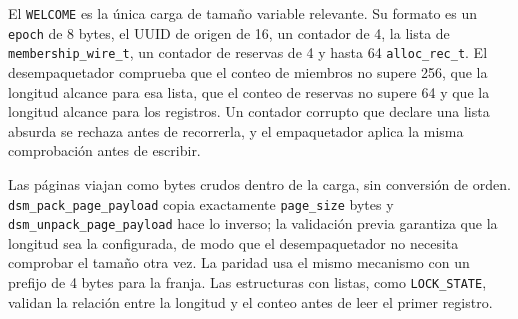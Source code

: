 El \texttt{WELCOME} es la única carga de tamaño variable relevante. Su formato es un \texttt{epoch} de 8 bytes, el UUID de origen de 16, un contador de 4, la lista de \texttt{membership\_wire\_t}, un contador de reservas de 4 y hasta 64 \texttt{alloc\_rec\_t}. El desempaquetador comprueba que el conteo de miembros no supere 256, que la longitud alcance para esa lista, que el conteo de reservas no supere 64 y que la longitud alcance para los registros. Un contador corrupto que declare una lista absurda se rechaza antes de recorrerla, y el empaquetador aplica la misma comprobación antes de escribir.

Las páginas viajan como bytes crudos dentro de la carga, sin conversión de orden. \texttt{dsm\_pack\_page\_payload} copia exactamente \texttt{page\_size} bytes y \texttt{dsm\_unpack\_page\_payload} hace lo inverso; la validación previa garantiza que la longitud sea la configurada, de modo que el desempaquetador no necesita comprobar el tamaño otra vez. La paridad usa el mismo mecanismo con un prefijo de 4 bytes para la franja. Las estructuras con listas, como \texttt{LOCK\_STATE}, validan la relación entre la longitud y el conteo antes de leer el primer registro.
